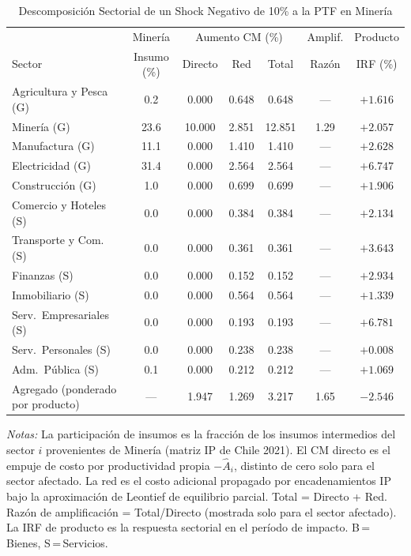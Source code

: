 \begin{table}[htbp]
\centering
\caption{Descomposición Sectorial de un Shock Negativo de 10\% a la PTF en Minería}
\label{tab:min_decomp}
\begin{threeparttable}
\small
\begin{tabular}{@{}l c c c c c c@{}}
\toprule
 & Minería & \multicolumn{3}{c}{Aumento CM (\%)} & Amplif. & Producto \\
\cmidrule(lr){3-5}
Sector & Insumo (\%) & Directo & Red & Total & Razón & IRF (\%) \\
\midrule
Agricultura y Pesca (G) &  0.2 & 0.000 & 0.648 & 0.648 & --- & $+1.616$ \\
Minería (G) & 23.6 & 10.000 & 2.851 & 12.851 &  1.29 & $+2.057$ \\
Manufactura (G) & 11.1 & 0.000 & 1.410 & 1.410 & --- & $+2.628$ \\
Electricidad (G) & 31.4 & 0.000 & 2.564 & 2.564 & --- & $+6.747$ \\
Construcción (G) &  1.0 & 0.000 & 0.699 & 0.699 & --- & $+1.906$ \\
Comercio y Hoteles (S) &  0.0 & 0.000 & 0.384 & 0.384 & --- & $+2.134$ \\
Transporte y Com. (S) &  0.0 & 0.000 & 0.361 & 0.361 & --- & $+3.643$ \\
Finanzas (S) &  0.0 & 0.000 & 0.152 & 0.152 & --- & $+2.934$ \\
Inmobiliario (S) &  0.0 & 0.000 & 0.564 & 0.564 & --- & $+1.339$ \\
Serv.\ Empresariales (S) &  0.0 & 0.000 & 0.193 & 0.193 & --- & $+6.781$ \\
Serv.\ Personales (S) &  0.0 & 0.000 & 0.238 & 0.238 & --- & $+0.008$ \\
Adm.\ Pública (S) &  0.1 & 0.000 & 0.212 & 0.212 & --- & $+1.069$ \\
\midrule
Agregado (ponderado por producto) & --- & 1.947 & 1.269 & 3.217 &  1.65 & $-2.546$ \\
\bottomrule
\end{tabular}
\begin{tablenotes}[flushleft]
\footnotesize
\item \textit{Notas:} La participación de insumos es la fracción de los insumos intermedios del sector $i$ provenientes de Minería (matriz IP de Chile 2021). El CM directo es el empuje de costo por productividad propia $-\hat A_i$, distinto de cero solo para el sector afectado. La red es el costo adicional propagado por encadenamientos IP bajo la aproximación de Leontief de equilibrio parcial. Total = Directo + Red. Razón de amplificación = Total/Directo (mostrada solo para el sector afectado). La IRF de producto es la respuesta sectorial en el período de impacto. B\,=\,Bienes, S\,=\,Servicios.
\end{tablenotes}
\end{threeparttable}
\end{table}
